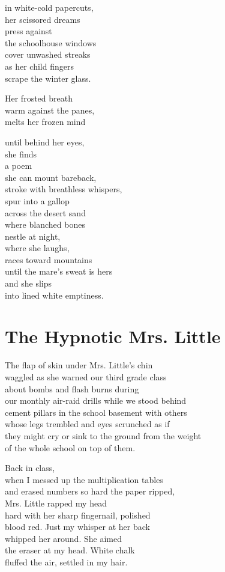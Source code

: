 \documentclass[twoside,10pt]{book}
\begin{document}
in white-cold papercuts,\\
her scissored dreams\\
press against\\
the schoolhouse windows\\
cover unwashed streaks\\
as her child fingers\\
scrape the winter glass.

Her frosted breath\\
warm against the panes,\\
melts her frozen mind

until behind her eyes,\\
she finds\\
a poem\\
she can mount bareback,\\
stroke with breathless whispers,\\
spur into a gallop\\
across the desert sand\\
where blanched bones\\
nestle at night,\\
where she laughs,\\
races toward mountains\\
until the mare's sweat is hers\\
and she slips\\
into lined white emptiness.


\clearpage
\section{The Hypnotic Mrs. Little}

The flap of skin under Mrs. Little's chin\\
waggled as she warned our third grade class\\
about bombs and flash burns during\\
our monthly air-raid drills while we stood behind\\
cement pillars in the school basement with others\\
whose legs trembled and eyes scrunched as if\\
they might cry or sink to the ground from the weight\\
of the whole school on top of them.

Back in class,\\
when I messed up the multiplication tables\\
and erased numbers so hard the paper ripped,\\
Mrs. Little rapped my head\\
hard with her sharp fingernail, polished\\
blood red. Just my whisper at her back\\
whipped her around. She aimed\\
the eraser at my head. White chalk\\
fluffed the air, settled in my hair.
\end{document}
